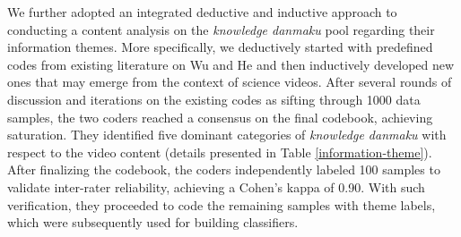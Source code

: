 We further adopted an integrated deductive and inductive approach to conducting a content analysis on the \textit{knowledge danmaku} pool regarding their information themes. 
More specifically, we deductively started with predefined codes from existing literature on Wu \cite{wu2019danmaku} and He \cite{he2021beyond} and then inductively developed new ones that may emerge from the context of science videos. 
After several rounds of discussion and iterations on the existing codes as sifting through 1000 data samples, the two coders reached a consensus on the final codebook, achieving saturation. They identified five dominant categories of \textit{knowledge danmaku} with respect to the video content (details presented in Table \ref{information-theme}).
After finalizing the codebook, the coders independently labeled 100 samples to validate inter-rater reliability, achieving a Cohen’s kappa of 0.90. With such verification, they proceeded to code the remaining samples with theme labels, which were subsequently used for building classifiers. 

